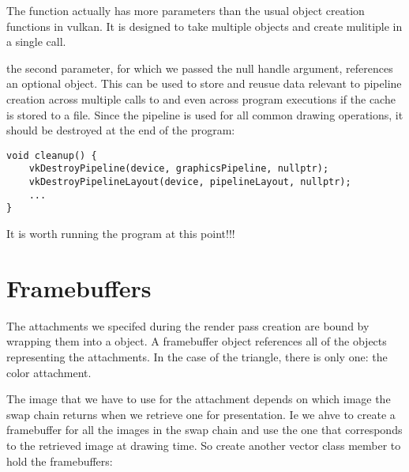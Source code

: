 \par The  function actually has more parameters than the usual object creation functions in vulkan. It is designed to take multiple  objects and create mulitiple  in a single call.

\par the second parameter, for which we passed the null handle argument, references an optional  object. This can be used to store and reusue data relevant to pipeline creation across multiple calls to  and even across program executions if the cache is stored to a file. Since the pipeline is used for all common drawing operations, it should be destroyed at the end of the program:

\begin{center}
\begin{minipage}{0.95\linewidth}
\begin{lstlisting}
void cleanup() {
    vkDestroyPipeline(device, graphicsPipeline, nullptr);
    vkDestroyPipelineLayout(device, pipelineLayout, nullptr);
    ...
}
\end{lstlisting}
\end{minipage}
\end{center}

\par It is worth running the program at this point!!!

\section*{Framebuffers}

\par The attachments we specifed during the render pass creation are bound by wrapping them into a  object. A framebuffer object references all of the  objects representing the attachments. In the case of the triangle, there is only one: the color attachment.

\par The image that we have to use for the attachment depends on which image the swap chain returns when we retrieve one for presentation. Ie we ahve to create a framebuffer for all the images in the swap chain and use the one that corresponds to the retrieved image at drawing time. So create another vector class member to hold the framebuffers:

